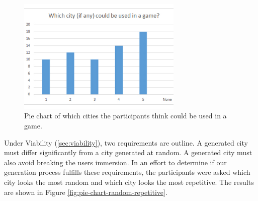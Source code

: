 \begin{figure}[h]
	\centering
	\includegraphics[width=0.7\textwidth]{"Images/UseInGame"}
	\caption{Pie chart of which cities the participants think could be used in a game.}
	\label{fig:pie-chart-use-in-game}
\end{figure}

Under Viability (\ref{sec:viability}), two requirements are outline. A generated city must differ significantly from a city generated at random. A generated city must also avoid breaking the users immersion. In an effort to determine if our generation process fulfills these requirements, the participants were asked which city looks the most random and which city looks the most repetitive. The results are shown in Figure \ref{fig:pie-chart-random-repetitive}.

